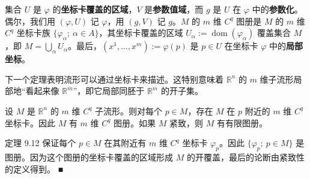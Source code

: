集合 $ U $ 是 $ \varphi $ 的\textbf{坐标卡覆盖的区域}，$ V $ 是\textbf{参数值域}，而 $ g $ 是 $ U $ 在 $ \varphi $ 中的\textbf{参数化}。偶尔，我们用 $ (\varphi, U) $ 记 $ \varphi $，用 $ (g, V) $ 记 $ g $。$ M $ 的 $ m $ 维 $ C^{q} $ 图册是 $ M $ 的 $ m $ 维 $ C^{q} $ 坐标卡族 $ \{\varphi_{\alpha} ; \ \alpha \in A\} $，其坐标卡覆盖的区域 $ U_{\alpha} := \operatorname{dom}(\varphi_{\alpha}) $ 覆盖集合 $ M $，即 $ M = \bigcup_{\alpha} U_{\alpha} $。最后，$ (x^{1}, \ldots, x^{m}) := \varphi(p) $ 是 $ p \in U $ 在坐标卡 $ \varphi $ 中的\textbf{局部坐标}。

下一个定理表明流形可以通过坐标卡来描述。这特别意味着 $ \mathbb{R}^{n} $ 的 $ m $ 维子流形局部地“看起来像 $ \mathbb{R}^{m} $”，即它局部同胚于 $ \mathbb{R}^{m} $ 的开子集。


\begin{theorem}

设 $ M $ 是 $ \mathbb{R}^{n} $ 的 $ m $ 维 $ C^{q} $ 子流形。则对每个 $ p \in M $，存在 $ M $ 在 $ p $ 附近的 $ m $ 维 $ C^{q} $ 坐标卡。因此 $ M $ 有 $ m $ 维 $ C^{q} $ 图册。如果 $ M $ 紧致，则 $ M $ 有有限图册。

\proofhead
定理 9.12 保证每个 $ p \in M $ 在其附近有 $ m $ 维 $ C^{q} $ 坐标卡 $ \varphi_{p} $。因此 $ \{\varphi_{p} ; \ p \in M\} $ 是图册。因为这个图册的坐标卡覆盖的区域形成 $ M $ 的开覆盖，最后的论断由紧致性的定义得到。 \nobreak\hspace{0.35em}■
\end{theorem}

